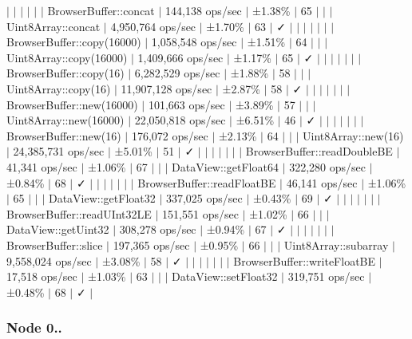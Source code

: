 $\vert$ $\vert$ $\vert$ $\vert$ $\vert$ $\vert$ Browser\+Buffer\+::concat $\vert$ 144,138 ops/sec $\vert$ ±1.38\% $\vert$ 65 $\vert$ $\vert$ $\vert$ Uint8\+Array\+::concat $\vert$ 4,950,764 ops/sec $\vert$ ±1.70\% $\vert$ 63 $\vert$ ✓ $\vert$ $\vert$ $\vert$ $\vert$ $\vert$ $\vert$ $\vert$ Browser\+Buffer\+::copy(16000) $\vert$ 1,058,548 ops/sec $\vert$ ±1.51\% $\vert$ 64 $\vert$ $\vert$ $\vert$ Uint8\+Array\+::copy(16000) $\vert$ 1,409,666 ops/sec $\vert$ ±1.17\% $\vert$ 65 $\vert$ ✓ $\vert$ $\vert$ $\vert$ $\vert$ $\vert$ $\vert$ $\vert$ Browser\+Buffer\+::copy(16) $\vert$ 6,282,529 ops/sec $\vert$ ±1.88\% $\vert$ 58 $\vert$ $\vert$ $\vert$ Uint8\+Array\+::copy(16) $\vert$ 11,907,128 ops/sec $\vert$ ±2.87\% $\vert$ 58 $\vert$ ✓ $\vert$ $\vert$ $\vert$ $\vert$ $\vert$ $\vert$ $\vert$ Browser\+Buffer\+::new(16000) $\vert$ 101,663 ops/sec $\vert$ ±3.89\% $\vert$ 57 $\vert$ $\vert$ $\vert$ Uint8\+Array\+::new(16000) $\vert$ 22,050,818 ops/sec $\vert$ ±6.51\% $\vert$ 46 $\vert$ ✓ $\vert$ $\vert$ $\vert$ $\vert$ $\vert$ $\vert$ $\vert$ Browser\+Buffer\+::new(16) $\vert$ 176,072 ops/sec $\vert$ ±2.13\% $\vert$ 64 $\vert$ $\vert$ $\vert$ Uint8\+Array\+::new(16) $\vert$ 24,385,731 ops/sec $\vert$ ±5.01\% $\vert$ 51 $\vert$ ✓ $\vert$ $\vert$ $\vert$ $\vert$ $\vert$ $\vert$ $\vert$ Browser\+Buffer\+::read\+Double\+BE $\vert$ 41,341 ops/sec $\vert$ ±1.06\% $\vert$ 67 $\vert$ $\vert$ $\vert$ Data\+View\+::get\+Float64 $\vert$ 322,280 ops/sec $\vert$ ±0.84\% $\vert$ 68 $\vert$ ✓ $\vert$ $\vert$ $\vert$ $\vert$ $\vert$ $\vert$ $\vert$ Browser\+Buffer\+::read\+Float\+BE $\vert$ 46,141 ops/sec $\vert$ ±1.06\% $\vert$ 65 $\vert$ $\vert$ $\vert$ Data\+View\+::get\+Float32 $\vert$ 337,025 ops/sec $\vert$ ±0.43\% $\vert$ 69 $\vert$ ✓ $\vert$ $\vert$ $\vert$ $\vert$ $\vert$ $\vert$ $\vert$ Browser\+Buffer\+::read\+U\+Int32\+LE $\vert$ 151,551 ops/sec $\vert$ ±1.02\% $\vert$ 66 $\vert$ $\vert$ $\vert$ Data\+View\+::get\+Uint32 $\vert$ 308,278 ops/sec $\vert$ ±0.94\% $\vert$ 67 $\vert$ ✓ $\vert$ $\vert$ $\vert$ $\vert$ $\vert$ $\vert$ $\vert$ Browser\+Buffer\+::slice $\vert$ 197,365 ops/sec $\vert$ ±0.95\% $\vert$ 66 $\vert$ $\vert$ $\vert$ Uint8\+Array\+::subarray $\vert$ 9,558,024 ops/sec $\vert$ ±3.08\% $\vert$ 58 $\vert$ ✓ $\vert$ $\vert$ $\vert$ $\vert$ $\vert$ $\vert$ $\vert$ Browser\+Buffer\+::write\+Float\+BE $\vert$ 17,518 ops/sec $\vert$ ±1.03\% $\vert$ 63 $\vert$ $\vert$ $\vert$ Data\+View\+::set\+Float32 $\vert$ 319,751 ops/sec $\vert$ ±0.48\% $\vert$ 68 $\vert$ ✓ $\vert$

\subsubsection*{Node 0..}


